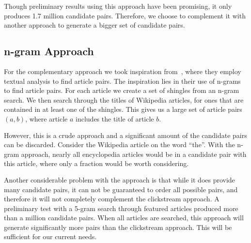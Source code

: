 Though preliminary results using this approach have been promising, it only produces 1.7 million candidate pairs.  Therefore, we choose to complement it with another approach to generate a bigger set of candidate pairs.

\subsection{n-gram Approach}

For the complementary approach we took inspiration from~\cite{milne2008learning}, where they employ textual analysis to find article pairs. The inspiration lies in their use of n-grams to find article pairs. For each article we create a set of shingles from an n-gram search. We then search through the titles of Wikipedia articles, for ones that are contained in at least one of the shingles. This gives us a large set of article pairs $(a,b)$, where article $a$ includes the title of article $b$.

However, this is a crude approach and a significant amount of the candidate pairs can be discarded. Consider the Wikipedia article on the word \enquote{the}. With the n-gram approach, nearly all encyclopedia articles would be in a candidate pair with this article, where only a fraction would be worth considering.


Another considerable problem with the approach is that while it does provide many candidate pairs, it can not be guaranteed to order all possible pairs, and therefore it will not completely complement the clickstream approach. A preliminary test with a 5-gram search through featured articles produced more than a million candidate pairs. When all articles are searched, this approach will generate significantly more pairs than the clickstream approach. This will be sufficient for our current needs.


